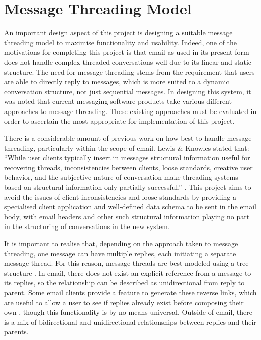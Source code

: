 \section{Message Threading Model}\label{sec:message-threading-model}
An important design aspect of this project is designing a suitable message threading model to maximise functionality and usability. Indeed, one of the motivations for completing this project is that email as used in its present form does not handle complex threaded conversations well due to its linear and static structure. The need for message threading stems from the requirement that users are able to directly reply to messages, which is more suited to a dynamic conversation structure, not just sequential messages. In designing this system, it was noted that current messaging software products take various different approaches to message threading. These existing approaches must be evaluated in order to ascertain the most appropriate for implementation of this project.

There is a considerable amount of previous work on how best to handle message threading, particularly within the scope of email. Lewis \& Knowles stated that: ``While user clients typically insert in messages structural information useful for recovering threads, inconsistencies between clients, loose standards, creative user behavior, and the subjective nature of conversation make threading systems based on structural information only partially successful.'' \cite{lewis1997threading}. This project aims to avoid the issues of client inconsistencies and loose standards by providing a specialised client application and well-defined data schema to be sent in the email body, with email headers and other such structural information playing no part in the structuring of conversations in the new system.

It is important to realise that, depending on the approach taken to message threading, one message can have multiple replies, each initiating a separate message thread. For this reason, message threads are best modeled using a tree structure \cite{palme1998message}. In email, there does not exist an explicit reference from a message to its replies, so the relationship can be described as unidirectional from reply to parent. Some email clients provide a feature to generate these reverse links, which are useful to allow a user to see if replies already exist before composing their own \cite{palme1998message}, though this functionality is by no means universal. Outside of email, there is a mix of bidirectional and unidirectional relationships between replies and their parents.

